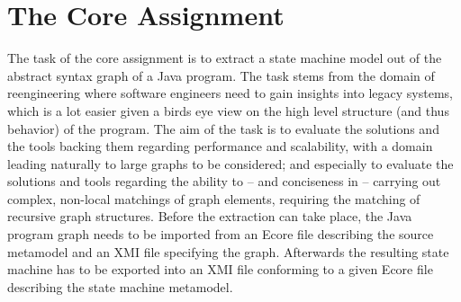 \documentclass[copyright]{eptcs}
\begin{document}
\section{The Core Assignment}

The task of the core assignment is to extract a state machine model out of the abstract syntax graph of a Java program.
The task stems from the domain of reengineering where software engineers need to gain insights into legacy systems, which is a lot easier given a birds eye view on the high level structure (and thus behavior) of the program.
The aim of the task is to evaluate the solutions and the tools backing them regarding performance and scalability, with a domain leading naturally to large graphs to be considered;
and especially to evaluate the solutions and tools regarding the ability to -- and conciseness in -- carrying out complex, non-local matchings of graph elements, requiring the matching of recursive graph structures.
Before the extraction can take place, the Java program graph needs to be imported from an Ecore file describing the source metamodel and an XMI file specifying the graph.
Afterwards the resulting state machine has to be exported into an XMI file conforming to a given Ecore file describing the state machine metamodel.
\end{document}

